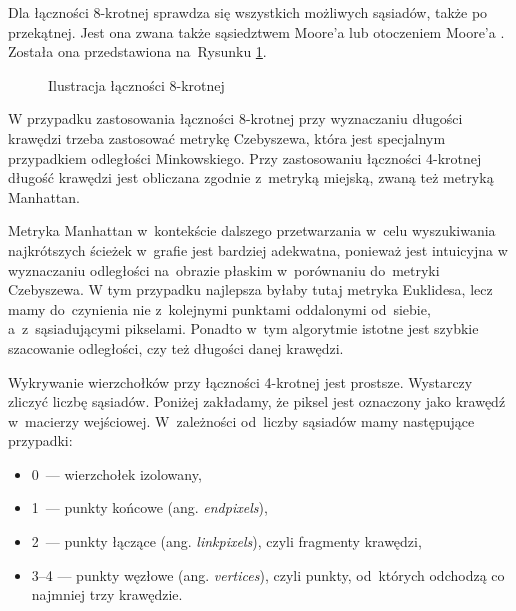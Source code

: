 \documentclass[a4paper,11pt,twoside,openright]{report}
\theoremstyle{definition}
\begin{document}
Dla łączności 8-krotnej sprawdza się wszystkich możliwych sąsiadów, także po
przekątnej. Jest ona zwana także sąsiedztwem Moore'a lub otoczeniem Moore'a \cite{Moore}.
Została ona przedstawiona na~Rysunku \ref{fig:8pixel}.

\begin{figure}[h!]
\begin{center}
\end{center}
\caption{Ilustracja łączności 8-krotnej}
\label{fig:8pixel}
\end{figure}

W przypadku zastosowania łączności 8-krotnej przy wyznaczaniu długości krawędzi
trzeba zastosować metrykę Czebyszewa, która jest specjalnym przypadkiem
odległości Minkowskiego. Przy zastosowaniu łączności 4-krotnej długość krawędzi
jest obliczana zgodnie z~metryką miejską, zwaną też metryką Manhattan.

Metryka Manhattan w~kontekście dalszego przetwarzania w~celu wyszukiwania
najkrótszych ścieżek w~grafie jest bardziej adekwatna, ponieważ jest intuicyjna
w wyznaczaniu odległości na~obrazie płaskim w~porównaniu do~metryki Czebyszewa.
W tym przypadku najlepsza byłaby tutaj metryka Euklidesa, lecz mamy do~czynienia
nie z~kolejnymi punktami oddalonymi od~siebie, a~z~sąsiadującymi pikselami.
Ponadto w~tym algorytmie istotne jest szybkie szacowanie odległości, czy też
długości danej krawędzi.

Wykrywanie wierzchołków przy łączności 4-krotnej jest prostsze. Wystarczy zliczyć
liczbę sąsiadów. Poniżej zakładamy, że piksel jest oznaczony jako krawędź w~macierzy
wejściowej. W~zależności od~liczby sąsiadów mamy następujące przypadki:
\begin{itemize}[noitemsep]
\item 0~--- wierzchołek izolowany,
\item 1~--- punkty końcowe (ang. \textit{endpixels}),
\item 2~--- punkty łączące (ang. \textit{linkpixels}), czyli fragmenty krawędzi,
\item 3--4 --- punkty węzłowe (ang. \textit{vertices}), czyli punkty, od~których odchodzą
co najmniej trzy krawędzie.
\end{itemize}
\end{document}
